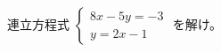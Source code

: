 \documentclass[../../../../hsm_tok_q.tex]{subfiles}
\begin{document}
    連立方程式 \;$\begin{cases} 8x - 5y = -3 \\ y = 2x - 1 \end{cases}$ を解け。
\end{document}
